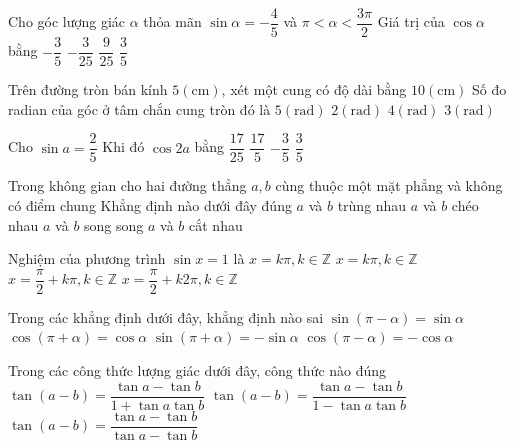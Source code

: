 \documentclass[11pt,a4paper,oneside]{article}
\begin{document}
	\begin{multicols}{2}
	\begin{ex}
	Cho góc lượng giác $\alpha$ thỏa mãn $\sin \alpha = -\dfrac{4}{5}$ và $\pi < \alpha < \dfrac{3\pi}{2}$ Giá trị của $\cos \alpha$ bằng
	\choice
	{$-\dfrac{3}{5}$}
	{$-\dfrac{3}{25}$}
	{$\dfrac{9}{25}$}
	{$\dfrac{3}{5}$}
	\loigiai{
	}
	\end{ex}
	\begin{ex}
	Trên đường tròn bán kính $5 (\text{cm})$, xét một cung có độ dài bằng $10 (\text{cm})$ Số đo radian của góc ở tâm chắn cung tròn đó là
	\choice
	{$5 (\text{rad})$}
	{$2 (\text{rad})$}
	{$4 (\text{rad})$}
	{$3 (\text{rad})$}
	\loigiai{
	}
	\end{ex}
	\begin{ex}
	Cho $\sin a = \dfrac{2}{5}$ Khi đó $\cos 2a$ bằng
	\choice
	{$\dfrac{17}{25}$}
	{$\dfrac{17}{5}$}
	{$-\dfrac{3}{5}$}
	{$\dfrac{3}{5}$}
	\loigiai{
	}
	\end{ex}
	\begin{ex}
	Trong không gian cho hai đường thẳng $a, b$ cùng thuộc một mặt phẳng và không có điểm chung Khẳng định nào dưới đây đúng
	\choice
	{$a$ và $b$ trùng nhau}
	{$a$ và $b$ chéo nhau}
	{$a$ và $b$ song song}
	{$a$ và $b$ cắt nhau}
	\loigiai{
	}
	\end{ex}
	\begin{ex}
	Nghiệm của phương trình $\sin x = 1$ là
	\choice
	{$x = k\pi, k \in \mathbb{Z}$}
	{$x = k\pi, k \in \mathbb{Z}$} %
	{$x = \dfrac{\pi}{2} + k\pi, k \in \mathbb{Z}$}
	{$x = \dfrac{\pi}{2} + k2\pi, k \in \mathbb{Z}$}
	\loigiai{
	}
	\end{ex}
	\begin{ex}
	Trong các khẳng định dưới đây, khẳng định nào sai
	\choice
	{$\sin(\pi - \alpha) = \sin \alpha$}
	{$\cos(\pi + \alpha) = \cos \alpha$}
	{$\sin(\pi + \alpha) = -\sin \alpha$}
	{$\cos(\pi - \alpha) = -\cos \alpha$}
	\loigiai{
	}
	\end{ex}
	\begin{ex}
	Trong các công thức lượng giác dưới đây, công thức nào đúng
	\choice
	{$\tan(a - b) = \dfrac{\tan a - \tan b}{1 + \tan a \tan b}$}
	{$\tan(a - b) = \dfrac{\tan a - \tan b}{1 - \tan a \tan b}$} %
	{$\tan(a - b) = \dfrac{\tan a - \tan b}{\tan a - \tan b}$} %

\end{ex}
\end{multicols}
\end{document}
